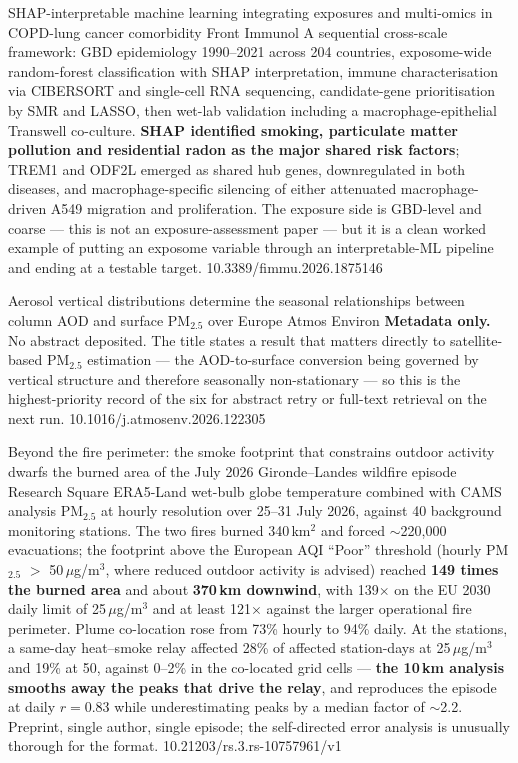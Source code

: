 \documentclass[10pt]{article}
\begin{document}
\clearpage


{SHAP-interpretable machine learning integrating exposures and multi-omics in COPD-lung cancer comorbidity}
{Front Immunol}
{A sequential cross-scale framework: GBD epidemiology 1990--2021 across 204 countries,
exposome-wide random-forest classification with SHAP interpretation, immune
characterisation via CIBERSORT and single-cell RNA sequencing, candidate-gene
prioritisation by SMR and LASSO, then wet-lab validation including a macrophage-epithelial
Transwell co-culture. \textbf{SHAP identified smoking, particulate matter pollution and
residential radon as the major shared risk factors}; TREM1 and ODF2L emerged as shared hub
genes, downregulated in both diseases, and macrophage-specific silencing of either
attenuated macrophage-driven A549 migration and proliferation. The exposure side is
GBD-level and coarse --- this is not an exposure-assessment paper --- but it is a clean
worked example of putting an exposome variable through an interpretable-ML pipeline and
ending at a testable target.}
{10.3389/fimmu.2026.1875146}

{Aerosol vertical distributions determine the seasonal relationships between column AOD and surface PM$_{2.5}$ over Europe}
{Atmos Environ}
{\textbf{Metadata only.} No abstract deposited. The title states a result that matters
directly to satellite-based PM$_{2.5}$ estimation --- the AOD-to-surface conversion being
governed by vertical structure and therefore seasonally non-stationary --- so this is the
highest-priority record of the six for abstract retry or full-text retrieval on the next
run.}
{10.1016/j.atmosenv.2026.122305}


{Beyond the fire perimeter: the smoke footprint that constrains outdoor activity dwarfs the burned area of the July 2026 Gironde--Landes wildfire episode}
{Research Square}
{ERA5-Land wet-bulb globe temperature combined with CAMS analysis PM$_{2.5}$ at hourly
resolution over 25--31 July 2026, against 40 background monitoring stations. The two
fires burned 340\,km$^2$ and forced $\sim$220{,}000 evacuations; the footprint above the
European AQI ``Poor'' threshold (hourly PM$_{2.5}$ $>$ 50\,$\mu$g/m$^3$, where reduced
outdoor activity is advised) reached \textbf{149 times the burned area} and about
\textbf{370\,km downwind}, with 139$\times$ on the EU 2030 daily limit of 25\,$\mu$g/m$^3$
and at least 121$\times$ against the larger operational fire perimeter. Plume co-location
rose from 73\% hourly to 94\% daily. At the stations, a same-day heat--smoke relay
affected 28\% of affected station-days at 25\,$\mu$g/m$^3$ and 19\% at 50, against
0--2\% in the co-located grid cells --- \textbf{the 10\,km analysis smooths away the peaks
that drive the relay}, and reproduces the episode at daily $r = 0.83$ while
underestimating peaks by a median factor of $\sim$2.2. Preprint, single author, single
episode; the self-directed error analysis is unusually thorough for the format.}
{10.21203/rs.3.rs-10757961/v1}
\end{document}
